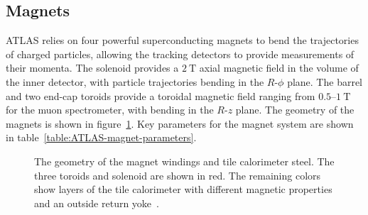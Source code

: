 \subsection{Magnets}\label{sec:ATLAS-magnets}
ATLAS relies on four powerful superconducting magnets to bend the trajectories of charged particles, allowing the tracking detectors to provide measurements of their momenta. The solenoid provides a $\SI{2}{\tesla}$ axial magnetic field in the volume of the inner detector, with particle trajectories bending in the $R$-$\phi$ plane. The barrel and two end-cap toroids provide a toroidal magnetic field ranging from $0.5$--$\SI{1}{\tesla}$ for the muon spectrometer, with bending in the $R$-$z$ plane. The geometry of the magnets is shown in figure~\ref{fig:ATLAS-magnets-sketch}. Key parameters for the magnet system are shown in table~\ref{table:ATLAS-magnet-parameters}.

\begin{figure}[htbp]
	\centering
	\caption[The geometry of the magnet windings and tile calorimeter steel. The three toroids and solenoid are shown in red. The remaining colors show layers of the tile calorimeter with different magnetic properties and an outside return yoke.]{The geometry of the magnet windings and tile calorimeter steel. The three toroids and solenoid are shown in red. The remaining colors show layers of the tile calorimeter with different magnetic properties and an outside return yoke~\cite{atlasphotos}.}
	\label{fig:ATLAS-magnets-sketch}
\end{figure}


